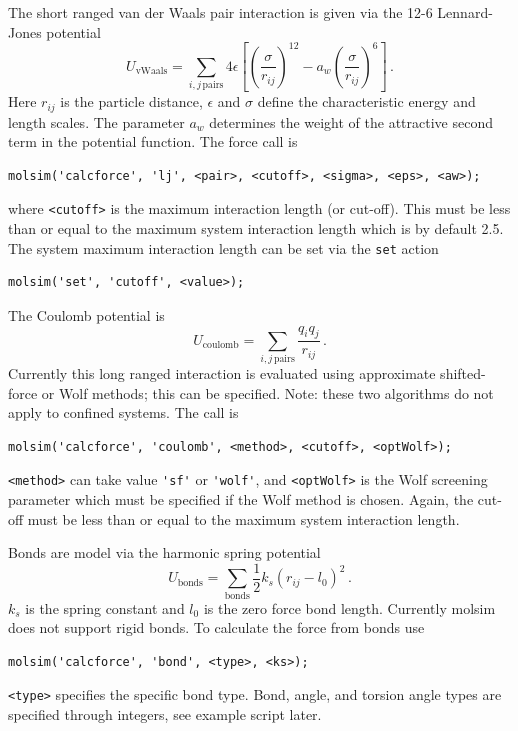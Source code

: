 \documentclass[11pt]{article}
\begin{document}
The short ranged van der Waals pair interaction is given via the 12-6 
Lennard-Jones potential
\begin{equation}
  U_\mathrm{vWaals} =  \sum_{i,j \, \mathrm{pairs}}
  4\epsilon\left[\left(\frac{\sigma}{r_{ij}}\right)^{12} - a_w
    \left(\frac{\sigma}{r_{ij}}\right)^{6}\right] \, .
\end{equation}
Here $r_{ij}$ is the particle distance, $\epsilon$ and $\sigma$ define the
characteristic energy and length scales. The parameter $a_w$ determines the
weight of the attractive second term in the potential function. The force call
is
\begin{verbatim}
molsim('calcforce', 'lj', <pair>, <cutoff>, <sigma>, <eps>, <aw>);
\end{verbatim}
where \verb!<cutoff>! is the maximum interaction length (or cut-off). This must
be less than or equal to the maximum system interaction length which is by
default 2.5. The system maximum interaction length can be set via the
\verb!set! action
\begin{verbatim}
molsim('set', 'cutoff', <value>);
\end{verbatim}

The Coulomb potential is 
\begin{equation}
  U_{\mathrm{coulomb}} = \sum_{i,j \, \mathrm{pairs}}\frac{q_iq_j}{r_{ij}} \, .
\end{equation}
Currently this long ranged interaction is evaluated using approximate
shifted-force or Wolf methods; this can be specified. Note: these two
algorithms do not apply to confined systems. The call is
\begin{verbatim}
molsim('calcforce', 'coulomb', <method>, <cutoff>, <optWolf>);
\end{verbatim}
\verb!<method>! can take value \verb!'sf'! or \verb!'wolf'!, and
\verb!<optWolf>! is the Wolf screening parameter which must be specified if the
Wolf method is chosen. Again, the cut-off must be less than or equal to the
maximum system interaction length.

Bonds are model via the harmonic spring potential
\begin{equation}
  U_{\mathrm{bonds}} =\sum_{\mathrm{bonds}} \frac{1}{2} k_{s}(r_{ij} - l_0)^2 \, .
\end{equation}
$k_s$ is the spring constant and $l_0$ is the zero force bond length. 
Currently \textsf{molsim} does not support rigid bonds. To calculate the force
from bonds use
\begin{verbatim}
molsim('calcforce', 'bond', <type>, <ks>);
\end{verbatim} 
\verb!<type>! specifies the specific bond type. Bond, angle, and torsion angle
types are specified through integers, see example script later. 
\end{document}
